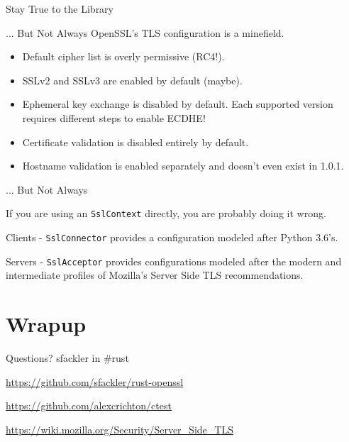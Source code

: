 \documentclass{beamer}
\begin{document}
\begin{frame}{Stay True to the Library}

\end{frame}

\begin{frame}[fragile]{... But Not Always}
    OpenSSL's TLS configuration is a minefield.

    \begin{itemize}
        \item Default cipher list is overly permissive (RC4!).
        \item SSLv2 and SSLv3 are enabled by default (maybe).
        \item Ephemeral key exchange is disabled by default. Each supported
            version requires different steps to enable ECDHE!
        \item Certificate validation is disabled entirely by default.
        \item Hostname validation is enabled separately and doesn't even exist
            in 1.0.1.
    \end{itemize}
\end{frame}

\begin{frame}[fragile]{... But Not Always}
    \begin{center}
        \Large If you are using an \verb!SslContext! directly, you are probably
        doing it wrong.
    \end{center}

    \pause

    Clients - \verb!SslConnector! provides a configuration modeled after Python
    3.6's.

    Servers - \verb!SslAcceptor! provides configurations modeled after the
    modern and intermediate profiles of Mozilla's Server Side TLS
    recommendations.
\end{frame}

\section{Wrapup}

\begin{frame}{Questions?}
    sfackler in \#rust

    \url{https://github.com/sfackler/rust-openssl}

    \url{https://github.com/alexcrichton/ctest}

    \url{https://wiki.mozilla.org/Security/Server_Side_TLS}
\end{frame}
\end{document}
